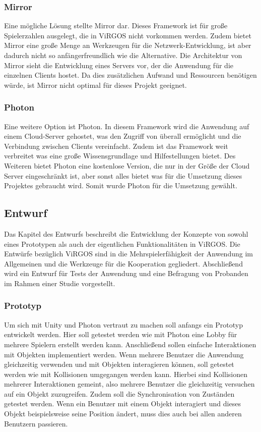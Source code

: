 \subsubsection{Mirror}
Eine mögliche Lösung stellte Mirror dar. Dieses Framework ist für große Spielerzahlen ausgelegt, die in ViRGOS nicht vorkommen werden. Zudem bietet Mirror eine große Menge an Werkzeugen für die Netzwerk-Entwicklung, ist aber dadurch nicht so anfängerfreundlich wie die Alternative. Die Architektur von Mirror sieht die Entwicklung eines Servers vor, der die Anwendung für die einzelnen Clients hostet. Da dies zusätzlichen Aufwand und Ressourcen benötigen würde, ist Mirror nicht optimal für dieses Projekt geeignet. 

\subsubsection{Photon}
Eine weitere Option ist Photon. In diesem Framework wird die Anwendung auf einem Cloud-Server gehostet, was den Zugriff von überall ermöglicht und die Verbindung zwischen Clients vereinfacht. Zudem ist das Framework weit verbreitet was eine große Wissensgrundlage und Hilfestellungen bietet. Des Weiteren bietet Photon eine kostenlose Version, die nur in der Größe der Cloud Server eingeschränkt ist, aber sonst alles bietet was für die Umsetzung dieses Projektes gebraucht wird. Somit wurde Photon für die Umsetzung gewählt. 

\newpage

\subsection{Entwurf}
Das Kapitel des Entwurfs beschreibt die Entwicklung der Konzepte von sowohl eines Prototypen als auch der eigentlichen Funktionalitäten in ViRGOS. Die Entwürfe bezüglich ViRGOS sind in die Mehrspielerfähigkeit der Anwendung im Allgemeinen und die Werkzeuge für die Kooperation gegliedert. Abschließend wird ein Entwurf für Tests der Anwendung und eine Befragung von Probanden im Rahmen einer Studie vorgestellt.

\subsubsection{Prototyp}
Um sich mit Unity und Photon vertraut zu machen soll anfangs ein Prototyp entwickelt werden. Hier soll getestet werden wie mit Photon eine Lobby für mehrere Spielern erstellt werden kann. Anschließend sollen einfache Interaktionen mit Objekten implementiert werden. Wenn mehrere Benutzer die Anwendung gleichzeitig verwenden und mit Objekten interagieren können, soll getestet werden wie mit Kollisionen umgegangen werden kann. Hierbei sind Kollisionen mehrerer Interaktionen gemeint, also mehrere Benutzer die gleichzeitig versuchen auf ein Objekt zuzugreifen. Zudem soll die Synchronisation von Zuständen getestet werden. Wenn ein Benutzer mit einem Objekt interagiert und dieses Objekt beispielsweise seine Position ändert, muss dies auch bei allen anderen Benutzern passieren. 


